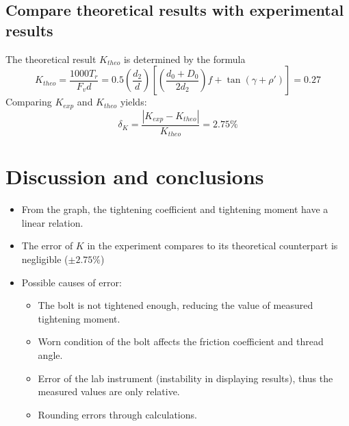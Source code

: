\subsection{Compare theoretical results with experimental results}
The theoretical result $ K_{theo} $ is determined by the formula \[ K_{theo} = \dfrac{1000T_r}{F_vd} = 0.5\left(\dfrac{d_2}{d}\right)\left[\left(\dfrac{d_{0}+D_0}{2d_2}\right)f + \tan(\gamma+\rho')\right] = 0.27\]
Comparing $ K_{exp} $ and $ K_{theo} $ yields:
\[\delta_K = \dfrac{|K_{exp}-K_{theo}|}{K_{theo}} = 2.75\%\]

\section{Discussion and conclusions}
\begin{itemize}
	\item From the graph, the tightening coefficient and tightening moment have a linear relation.
	\item The error of $ K $ in the experiment compares to its theoretical counterpart is negligible ($ \pm 2.75\% $)
	\item Possible causes of error:
	\begin{itemize}
		\item The bolt is not tightened enough, reducing the value of measured tightening moment.
		\item Worn condition of the bolt affects the friction coefficient and thread angle.
		\item Error of the lab instrument (instability in displaying results), thus the measured values are only relative.
		\item  Rounding errors through calculations.
	\end{itemize}
\end{itemize}




